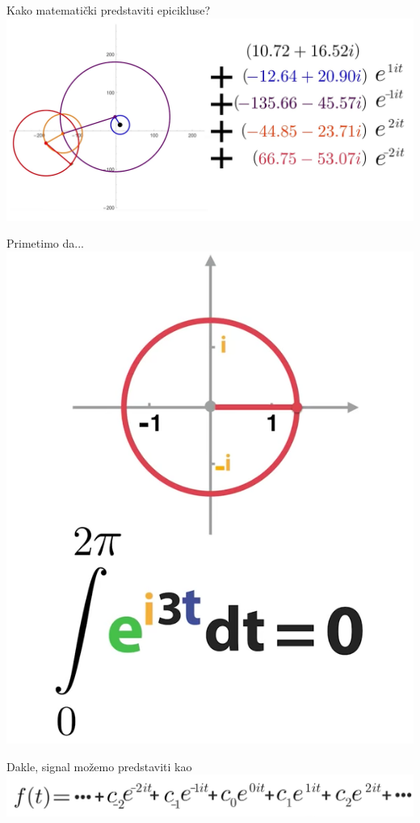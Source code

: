 \documentclass{beamer}
\begin{document}
\begin{frame}{Kako matemati\v{c}ki predstaviti epicikluse?}
    \centering
    \includegraphics[scale=0.35]{images/ep7.PNG}
\end{frame}

\begin{frame}{Primetimo da...}
    \centering
    \includegraphics[scale=0.35]{images/ep6.PNG}
\end{frame}

\begin{frame}{Dakle, signal mo\v{z}emo predstaviti kao}
    \centering
    \includegraphics[scale=0.3]{images/ep8.PNG}
\end{frame}
\end{document}
